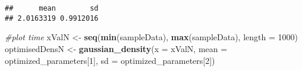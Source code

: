 \documentclass[
]{article}
\newenvironment{Shaded}{\begin{snugshade}}{\end{snugshade}}
\newcommand{\AttributeTok}[1]{\textcolor[rgb]{0.13,0.29,0.53}{#1}}
\newcommand{\CommentTok}[1]{\textcolor[rgb]{0.56,0.35,0.01}{\textit{#1}}}
\newcommand{\DecValTok}[1]{\textcolor[rgb]{0.00,0.00,0.81}{#1}}
\newcommand{\FunctionTok}[1]{\textcolor[rgb]{0.13,0.29,0.53}{\textbf{#1}}}
\newcommand{\NormalTok}[1]{#1}
\newcommand{\OtherTok}[1]{\textcolor[rgb]{0.56,0.35,0.01}{#1}}
\begin{document}
\begin{verbatim}
##      mean        sd 
## 2.0163319 0.9912016
\end{verbatim}

\begin{Shaded}
\begin{Highlighting}[]
\CommentTok{\#plot time}
\NormalTok{xValN }\OtherTok{\textless{}{-}} \FunctionTok{seq}\NormalTok{(}\FunctionTok{min}\NormalTok{(sampleData), }\FunctionTok{max}\NormalTok{(sampleData), }\AttributeTok{length =} \DecValTok{1000}\NormalTok{)}
\NormalTok{optimisedDensN }\OtherTok{\textless{}{-}} \FunctionTok{gaussian\_density}\NormalTok{(}\AttributeTok{x =}\NormalTok{ xValN, }\AttributeTok{mean =}\NormalTok{ optimized\_parameters[}\DecValTok{1}\NormalTok{], }\AttributeTok{sd =}\NormalTok{ optimized\_parameters[}\DecValTok{2}\NormalTok{])}
\end{Highlighting}
\end{Shaded}
\end{document}
